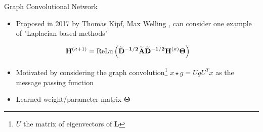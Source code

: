 \documentclass{beamer}
\newcommand{\node}{v}
\newcommand{\nrepresent}{h}
\newcommand{\NodeRepMat}{\mathbf{H}}
\newcommand{\edge}{e}
\newcommand{\DegMat}{\mathbf{D}}
\newcommand{\iter}{\kappa}
\newcommand{\AdjMat}{\mathbf{A}}
\newcommand{\LapMat}{\mathbf{L}}
\newcommand{\ReLu}{\text{ReLu}}
\begin{document}
\begin{frame}{Graph Convolutional Network}
    \begin{itemize}
    \item Proposed in 2017 by Thomas Kipf, Max Welling \cite{kipf_semi-supervised_2017}, can consider one example of "Laplacian-based methods" \cite{gilmer_neural_2017} 
    \end{itemize}
    
        \begin{align*}
        \iffalse
            \mathbf{\nrepresent}_\node^{(\iter+1)} 
            &=
            \text{Update}
            \left( 
            x_\node^{(\iter)}
            ,   
            \text{Aggregate}
            (
                \nrepresent_\node^{(\iter)}, x_u^{(\iter)}, \edge_{u,\node}^{(\iter)}
            )
            \right)
        \\
        \fi 
            \NodeRepMat^{(\iter+1)} 
            &=
            \ReLu
            \left( 
                \mathbf{
                \widetilde{\DegMat}^{-1/2}
                \widetilde{\AdjMat}
                \widetilde{\DegMat}^{-1/2}  
                \NodeRepMat^{(\iter)}
                \Theta 
                }            
            \right)
    \end{align*}
    
    \begin{itemize}
        \item Motivated by considering the graph convolution\footnote{$U$ the matrix of eigenvectors of $\LapMat$} $x \star g = UgU^Tx$ as the message passing function 
        \item Learned weight/parameter matrix $\boldsymbol\Theta$
    \end{itemize}
    \end{frame}
\end{document}
